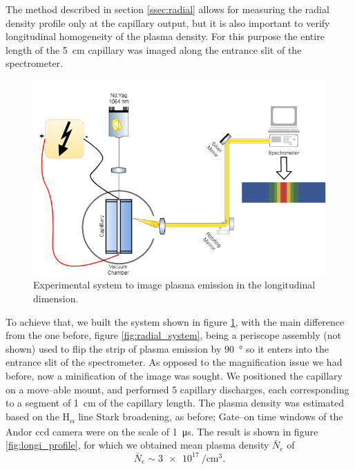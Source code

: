 \documentclass[../main.tex]{subfiles}
\begin{document}
The method described in section \ref{ssec:radial} allows for measuring the radial density profile only at the capillary output, but it is also important to verify longitudinal homogeneity of the plasma density. For this purpose the entire length of the \SI{5}{\cm} capillary was imaged along the entrance slit of the spectrometer.
\begin{figure}
    \centering
    \includegraphics[width=\textwidth]{figures/spectro/longitudinal_system.png}
    \caption{Experimental system to image plasma emission in the longitudinal dimension.}
    \label{fig:longi_system}
\end{figure}

To achieve that, we built the system shown in figure \ref{fig:longi_system}, with the main difference from the one before, figure \ref{fig:radial_system}, being a periscope assembly (not shown) used to flip the strip of plasma emission by \SI{90}{\degree} so it enters into the entrance slit of the spectrometer. As opposed to the magnification issue we had before, now a minification of the image was sought. We positioned the capillary on a move--able mount, and performed 5 capillary discharges, each corresponding to a segment of \SI{1}{\cm} of the capillary length. The plasma density was estimated based on the H\textsubscript{$\alpha$} line Stark broadening, as before; Gate--on time windows of the Andor ccd camera were on the scale of \SI{1}{\us}. The result is shown in figure \ref{fig:longi_profile}, for which we obtained mean plasma density $\bar{N}_e$ of
\begin{equation*}
    \bar{N}_e \sim \SI{3e17}{\per\cubic\cm}.
\end{equation*}
\end{document}
